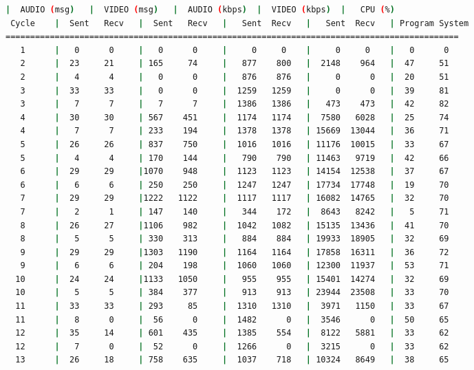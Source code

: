 \begin{adjustbox}{max width=\textwidth}
\begin{lstlisting}[language=bash,basicstyle=\ttfamily\scriptsize]
          |  AUDIO (msg)   |  VIDEO (msg)   |  AUDIO (kbps)  |  VIDEO (kbps)  |   CPU (%)
 Cycle    |  Sent   Recv   |  Sent   Recv   |   Sent  Recv   |   Sent  Recv   | Program System
============================================================================================
   1      |   0      0     |   0      0     |     0     0    |     0     0    |   0      0
   2      |  23     21     | 165     74     |   877    800   |  2148    964   |  47     51
   2      |   4      4     |   0      0     |   876    876   |     0      0   |  20     51
   3      |  33     33     |   0      0     |  1259   1259   |     0      0   |  39     81
   3      |   7      7     |   7      7     |  1386   1386   |   473    473   |  42     82
   4      |  30     30     | 567    451     |  1174   1174   |  7580   6028   |  25     74
   4      |   7      7     | 233    194     |  1378   1378   | 15669  13044   |  36     71
   5      |  26     26     | 837    750     |  1016   1016   | 11176  10015   |  33     67
   5      |   4      4     | 170    144     |   790    790   | 11463   9719   |  42     66
   6      |  29     29     |1070    948     |  1123   1123   | 14154  12538   |  37     67
   6      |   6      6     | 250    250     |  1247   1247   | 17734  17748   |  19     70
   7      |  29     29     |1222   1122     |  1117   1117   | 16082  14765   |  32     70
   7      |   2      1     | 147    140     |   344    172   |  8643   8242   |   5     71
   8      |  26     27     |1106    982     |  1042   1082   | 15135  13436   |  41     70
   8      |   5      5     | 330    313     |   884    884   | 19933  18905   |  32     69
   9      |  29     29     |1303   1190     |  1164   1164   | 17858  16311   |  36     72
   9      |   6      6     | 204    198     |  1060   1060   | 12300  11937   |  53     71
  10      |  24     24     |1133   1050     |   955    955   | 15401  14274   |  32     69
  10      |   5      5     | 384    377     |   913    913   | 23944  23508   |  33     70
  11      |  33     33     | 293     85     |  1310   1310   |  3971   1150   |  33     67
  11      |   8      0     |  56      0     |  1482      0   |  3546      0   |  50     65
  12      |  35     14     | 601    435     |  1385    554   |  8122   5881   |  33     62
  12      |   7      0     |  52      0     |  1266      0   |  3215      0   |  33     62
  13      |  26     18     | 758    635     |  1037    718   | 10324   8649   |  38     65

\end{lstlisting}
\end{adjustbox}
